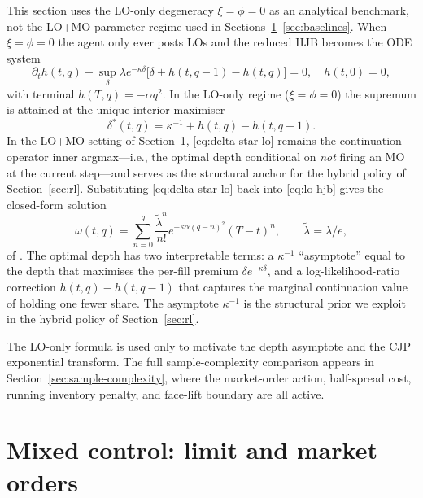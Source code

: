 \documentclass[]{interact}
\theoremstyle{plain}
\theoremstyle{definition}
\theoremstyle{remark}
\newcommand{\1}[1]{\mathbf{1}_{\{#1\}}}
\newcommand{\ltil}{\widetilde{\lambda}}
\begin{document}
This section uses the LO-only degeneracy $\xi=\phi=0$ as an analytical benchmark, not the LO+MO parameter regime used in Sections~\ref{sec:lo-mo}--\ref{sec:baselines}. When $\xi = \phi = 0$ the agent only ever posts LOs and the reduced HJB becomes the ODE system
\begin{equation}\label{eq:lo-hjb}
\partial_t h(t,q) + \sup_\delta \lambda e^{-\kappa \delta}\bigl[ \delta + h(t,q-1) - h(t,q)\bigr] = 0,
\quad h(t,0) = 0,
\end{equation}
with terminal $h(T,q) = -\alpha q^2$. In the LO-only regime ($\xi = \phi = 0$) the supremum is attained at the unique interior maximiser
\begin{equation}\label{eq:delta-star-lo}
\delta^*(t,q) = \kappa^{-1} + h(t,q) - h(t,q-1).
\end{equation}
In the LO+MO setting of Section~\ref{sec:lo-mo}, \eqref{eq:delta-star-lo} remains the continuation-operator inner argmax---i.e., the optimal depth conditional on \emph{not} firing an MO at the current step---and serves as the structural anchor for the hybrid policy of Section~\ref{sec:rl}. Substituting \eqref{eq:delta-star-lo} back into \eqref{eq:lo-hjb} gives the closed-form solution
\begin{equation}\label{eq:omega-poisson}
\omega(t,q) = \sum_{n=0}^{q} \frac{\ltil^n}{n!} e^{-\kappa\alpha (q-n)^2} (T-t)^n,
\qquad \ltil = \lambda / e,
\end{equation}
of \citet[\S 8.2]{cjp2015}. The optimal depth has two interpretable terms: a $\kappa^{-1}$ ``asymptote'' equal to the depth that maximises the per-fill premium $\delta e^{-\kappa \delta}$, and a log-likelihood-ratio correction $h(t,q) - h(t,q-1)$ that captures the marginal continuation value of holding one fewer share. The asymptote $\kappa^{-1}$ is the structural prior we exploit in the hybrid policy of Section~\ref{sec:rl}.

The LO-only formula is used only to motivate the depth asymptote and the CJP exponential transform. The full sample-complexity comparison appears in Section~\ref{sec:sample-complexity}, where the market-order action, half-spread cost, running inventory penalty, and face-lift boundary are all active.

\section{Mixed control: limit and market orders}\label{sec:lo-mo}
\end{document}
